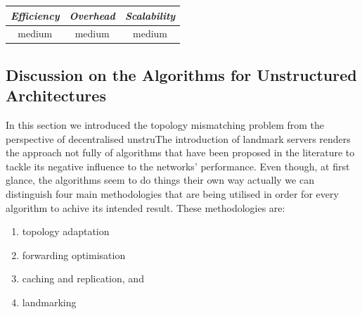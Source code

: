 \begin{center}
\begin{tabular}{ccc}
\emph{Efficiency} & \emph{Overhead} & \emph{Scalability} \\
\hline
medium &
medium &
medium
\end{tabular}
\end{center}

\subsection{Discussion on the Algorithms for Unstructured Architectures}

In this section we introduced the topology mismatching problem from the
perspective of decentralised unstruThe introduction of landmark servers renders
the approach not fully
of algorithms that have been proposed in the literature to tackle its negative
influence to the networks' performance. Even though, at first glance, the
algorithms seem to do things their own way actually we can distinguish four main
methodologies that are being utilised in order for every algorithm to achive its
intended result. These methodologies are:
\begin{enumerate}
  \item topology adaptation
  \item forwarding optimisation
  \item caching and replication, and
  \item landmarking
\end{enumerate}

